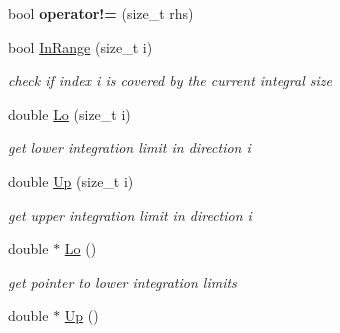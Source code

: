 \begin{DoxyCompactItemize}
\item 
\hypertarget{classIntegral_affe5fc13694efa8b91f1aa4266ca23c3}{bool {\bfseries operator!=} (size\-\_\-t rhs)}\label{classIntegral_affe5fc13694efa8b91f1aa4266ca23c3}

\item 
\hypertarget{classIntegral_a7b7f60c30e769eedb0d7ecbf5f393fa0}{bool \hyperlink{classIntegral_a7b7f60c30e769eedb0d7ecbf5f393fa0}{In\-Range} (size\-\_\-t i)}\label{classIntegral_a7b7f60c30e769eedb0d7ecbf5f393fa0}

\begin{DoxyCompactList}\small\item\em check if index i is covered by the current integral size \end{DoxyCompactList}\item 
\hypertarget{classIntegral_a3cb1093faf75a75b2024d865dc1e1d4a}{double \hyperlink{classIntegral_a3cb1093faf75a75b2024d865dc1e1d4a}{Lo} (size\-\_\-t i)}\label{classIntegral_a3cb1093faf75a75b2024d865dc1e1d4a}

\begin{DoxyCompactList}\small\item\em get lower integration limit in direction i \end{DoxyCompactList}\item 
\hypertarget{classIntegral_a44b55ae610a5910d706acd88d13896da}{double \hyperlink{classIntegral_a44b55ae610a5910d706acd88d13896da}{Up} (size\-\_\-t i)}\label{classIntegral_a44b55ae610a5910d706acd88d13896da}

\begin{DoxyCompactList}\small\item\em get upper integration limit in direction i \end{DoxyCompactList}\item 
\hypertarget{classIntegral_a891fceeeac3a1c8475955c91fddfc69d}{double $\ast$ \hyperlink{classIntegral_a891fceeeac3a1c8475955c91fddfc69d}{Lo} ()}\label{classIntegral_a891fceeeac3a1c8475955c91fddfc69d}

\begin{DoxyCompactList}\small\item\em get pointer to lower integration limits \end{DoxyCompactList}\item 
\hypertarget{classIntegral_a8610f52e6f7540048afa5714fd5f6748}{double $\ast$ \hyperlink{classIntegral_a8610f52e6f7540048afa5714fd5f6748}{Up} ()}\label{classIntegral_a8610f52e6f7540048afa5714fd5f6748}


\end{DoxyCompactItemize}
